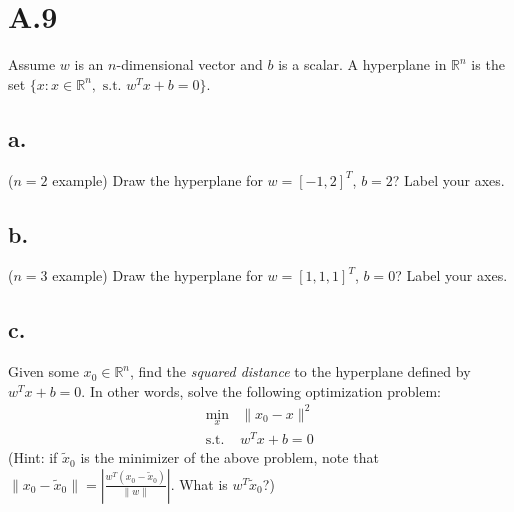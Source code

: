 \documentclass{article}
\newcommand{\field}[1]{\mathbb{#1}}
\newcommand{\1}{\mathbf{1}}
\newcommand{\R}{\field{R}} %
\begin{document}
\section*{A.9}
{\Large 

Assume $w$ is an $n$-dimensional vector and $b$ is a scalar. A hyperplane in $\R^n$ is the set $\{x : x\in \R^n,\text{ s.t. } w^T x + b = 0\}$.

\subsection*{a.}
($n=2$ example) Draw the hyperplane for $w=[-1,2]^T$, $b=2$? Label your axes.

\subsection*{b.}
($n=3$ example) Draw the hyperplane for $w=[1,1,1]^T$, $b=0$? Label your axes.

\subsection*{c.}
Given some $x_0 \in \R^n$, find the \emph{squared distance} to the hyperplane defined by $w^T x + b=0$.
	In other words, solve the following optimization problem:
	\begin{align*}
	\min_x& \|x_0 - x \|^2\\
	\text{s.t. }&w^Tx +b = 0
	\end{align*}
	(Hint: if $\widetilde{x}_0$ is the minimizer of the above problem, note that $\| x_0 - \widetilde{x}_0 \| = | \frac{w^T(x_0 - \widetilde{x}_0)}{\|w\|} |$. What is $w^T \widetilde{x}_0$?)

}
\end{document}
